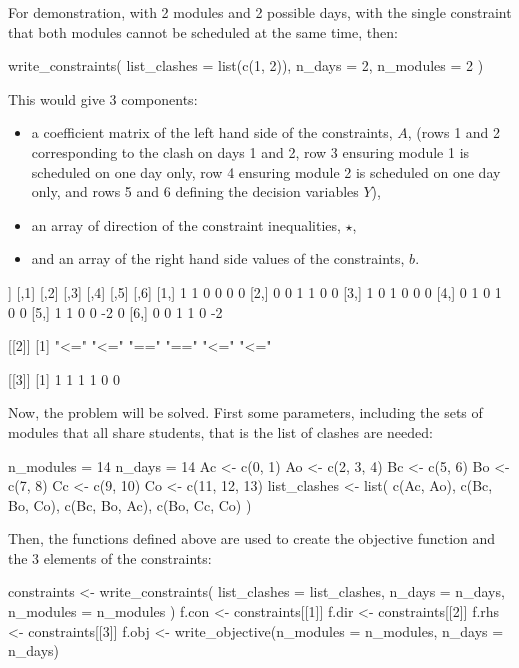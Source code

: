 For demonstration, with 2 modules and 2 possible days, with the single
constraint that both modules cannot be scheduled at the same time, then:

\begin{Rin-no-test}
write_constraints(
  list_clashes = list(c(1, 2)),
  n_days = 2,
  n_modules = 2
)
\end{Rin-no-test}

This would give 3 components:

\begin{itemize}
  \item a coefficient matrix of the left hand side of the constraints, \(A\), (rows 1
  and 2 corresponding to the clash on days 1 and 2, row 3 ensuring module 1 is
  scheduled on one day only, row 4 ensuring module 2 is scheduled on one day
  only, and rows 5 and 6 defining the decision variables \(Y\)),
  \item an array of direction of the constraint inequalities, \(\star\),
  \item and an array of the right hand side values of the constraints, \(b\).
\end{itemize}

\begin{Rout-no-test}
[[1]]
     [,1] [,2] [,3] [,4] [,5] [,6]
[1,]    1    1    0    0    0    0
[2,]    0    0    1    1    0    0
[3,]    1    0    1    0    0    0
[4,]    0    1    0    1    0    0
[5,]    1    1    0    0   -2    0
[6,]    0    0    1    1    0   -2

[[2]]
[1] "<=" "<=" "==" "==" "<=" "<="

[[3]]
[1] 1 1 1 1 0 0
\end{Rout-no-test}

Now, the problem will be solved.
First some parameters, including the sets of modules that all share
students, that is the list of clashes are needed:

\begin{Rin-no-test}
n_modules = 14
n_days = 14
Ac <- c(0, 1)
Ao <- c(2, 3, 4)
Bc <- c(5, 6)
Bo <- c(7, 8)
Cc <- c(9, 10)
Co <- c(11, 12, 13)
list_clashes <- list(
  c(Ac, Ao),
  c(Bc, Bo, Co),
  c(Bc, Bo, Ac),
  c(Bo, Cc, Co)
)
\end{Rin-no-test}

Then, the functions defined above are used to create the objective function and
the 3 elements of the constraints:

\begin{Rin-no-test}
constraints <- write_constraints(
  list_clashes = list_clashes,
  n_days = n_days,
  n_modules = n_modules
)
f.con <- constraints[[1]]
f.dir <- constraints[[2]]
f.rhs <- constraints[[3]]
f.obj <- write_objective(n_modules = n_modules, n_days = n_days)
\end{Rin-no-test}

